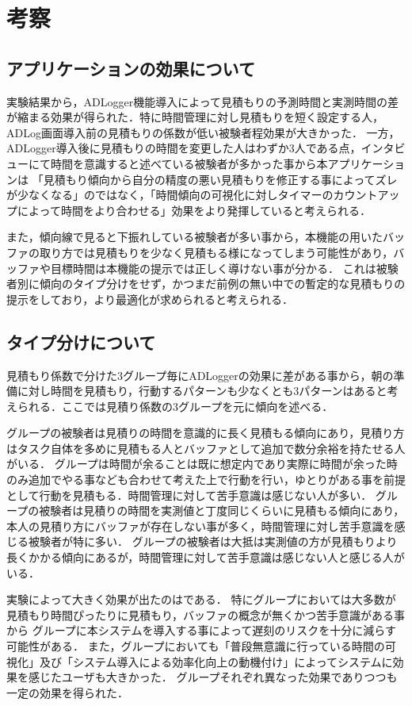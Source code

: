 \section{考察}
\subsection{アプリケーションの効果について}
実験結果から，ADLogger機能導入によって見積もりの予測時間と実測時間の差が縮まる効果が得られた．特に時間管理に対し見積もりを短く設定する人，ADLog画面導入前の見積もりの係数が低い被験者程効果が大きかった．
一方，ADLogger導入後に見積もりの時間を変更した人はわずか3人である点，インタビューにて時間を意識すると述べている被験者が多かった事から本アプリケーションは
「見積もり傾向から自分の精度の悪い見積もりを修正する事によってズレが少なくなる」のではなく，「時間傾向の可視化に対しタイマーのカウントアップによって時間をより合わせる」効果をより発揮していると考えられる．

また，傾向線で見ると下振れしている被験者が多い事から，本機能の用いたバッファの取り方では見積もりを少なく見積もる様になってしまう可能性があり，バッファや目標時間は本機能の提示では正しく導けない事が分かる．
これは被験者別に傾向のタイプ分けをせず，かつまだ前例の無い中での暫定的な見積もりの提示をしており，より最適化が求められると考えられる．

\subsection{タイプ分けについて}
見積もり係数で分けた3グループ毎にADLoggerの効果に差がある事から，朝の準備に対し時間を見積もり，行動するパターンも少なくとも3パターンはあると考えられる．ここでは見積り係数の3グループを元に傾向を述べる．

グループの被験者は見積りの時間を意識的に長く見積もる傾向にあり，見積り方はタスク自体を多めに見積もる人とバッファとして追加で数分余裕を持たせる人がいる．
グループは時間が余ることは既に想定内であり実際に時間が余った時のみ追加でやる事なども合わせて考えた上で行動を行い，ゆとりがある事を前提として行動を見積もる．時間管理に対して苦手意識は感じない人が多い．
グループの被験者は見積りの時間を実測値と丁度同じくらいに見積もる傾向にあり，本人の見積り方にバッファが存在しない事が多く，時間管理に対し苦手意識を感じる被験者が特に多い．
グループの被験者は大抵は実測値の方が見積もりより長くかかる傾向にあるが，時間管理に対して苦手意識は感じない人と感じる人がいる．

実験によって大きく効果が出たのはである．
特にグループにおいては大多数が見積もり時間ぴったりに見積もり，バッファの概念が無くかつ苦手意識がある事から
グループに本システムを導入する事によって遅刻のリスクを十分に減らす可能性がある．
また，グループにおいても「普段無意識に行っている時間の可視化」及び「システム導入による効率化向上の動機付け」によってシステムに効果を感じたユーザも大きかった．
グループそれぞれ異なった効果でありつつも一定の効果を得られた．